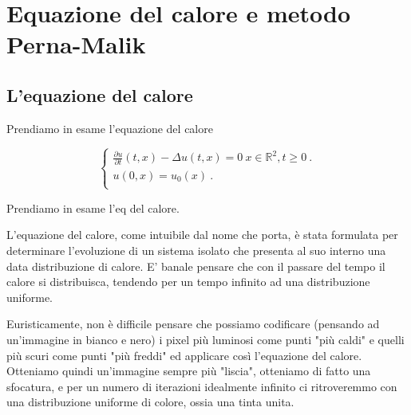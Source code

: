 \chapter{Equazione del calore e metodo Perna-Malik}

\section{L'equazione del calore}

\raggedright

Prendiamo in esame l'equazione del calore

\begin{equation} 
\begin{cases}

\frac{\partial u}{\partial t}(t,x)-\Delta u(t,x) = 0 \ x \in \mathbb R^2, t\ge 0 \ .\\ 

u(0,x) = u_0(x)\ . \\

\end{cases}
\end{equation}

Prendiamo in esame l'eq del calore.

L'equazione del calore, come intuibile dal nome che porta, è stata formulata per determinare l'evoluzione di un sistema isolato che presenta al suo interno una data distribuzione di calore. E' banale pensare che con il passare del tempo il calore si distribuisca, tendendo per un tempo infinito ad una distribuzione uniforme.

\vspace{1em}

Euristicamente, non è difficile pensare che possiamo codificare (pensando ad un'immagine in bianco e nero) i pixel più luminosi come punti "più caldi" e quelli più scuri come punti "più freddi" ed applicare così l'equazione del calore.\\
Otteniamo quindi un'immagine sempre più "liscia", otteniamo di fatto una sfocatura, e per un numero di iterazioni idealmente infinito ci ritroveremmo con una distribuzione uniforme di colore, ossia una tinta unita.

\vspace{1em}

